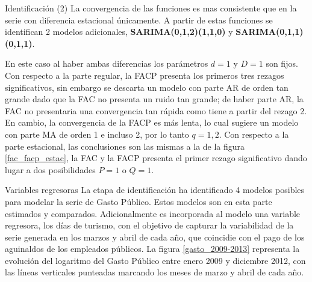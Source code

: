 \documentclass[
  ignorenonframetext,
]{beamer}
\begin{document}
\begin{frame}{Identificación (2)}
\protect\hypertarget{identificaciuxf3n-2}{}
La convergencia de las funciones es mas consistente que en la serie con
diferencia estacional únicamente. A partir de estas funciones se
identifican 2 modelos adicionales, \textbf{SARIMA(0,1,2)(1,1,0)} y
\textbf{SARIMA(0,1,1)(0,1,1)}.

En este caso al haber ambas diferencias los parámetros \(d=1\) y \(D=1\)
son fijos. Con respecto a la parte regular, la FACP presenta los
primeros tres rezagos significativos, sin embargo se descarta un modelo
con parte AR de orden tan grande dado que la FAC no presenta un ruido
tan grande; de haber parte AR, la FAC no presentaria una convergencia
tan rápida como tiene a partir del rezago 2. En cambio, la convergencia
de la FACP es más lenta, lo cual sugiere un modelo con parte MA de orden
1 e incluso 2, por lo tanto \(q={1,2}\). Con respecto a la parte
estacional, las conclusiones son las mismas a la de la figura
\ref{fac_facp_estac}, la FAC y la FACP presenta el primer rezago
significativo dando lugar a dos posibilidades \(P=1\) o \(Q=1\).
\end{frame}

\begin{frame}{Variables regresoras}
\protect\hypertarget{variables-regresoras}{}
La etapa de identificación ha identificado 4 modelos posibles para
modelar la serie de Gasto Público. Estos modelos son en esta parte
estimados y comparados. Adicionalmente es incorporada al modelo una
variable regresora, los días de turismo, con el objetivo de capturar la
variabilidad de la serie generada en los marzos y abril de cada año, que
coincidie con el pago de los aguinaldos de los empleados públicos. La
figura \ref{gasto_2009-2013} representa la evolución del logaritmo del
Gasto Público entre enero 2009 y diciembre 2012, con las líneas
verticales punteadas marcando los meses de marzo y abril de cada año.
\end{frame}
\end{document}

